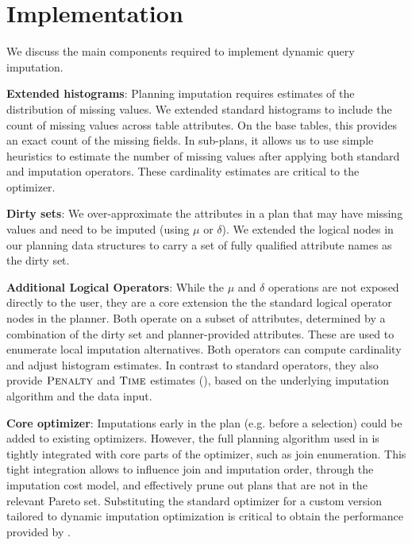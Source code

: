\section{Implementation}
We discuss the main components required to implement dynamic query imputation.

\textbf{Extended histograms}: Planning imputation requires estimates of the distribution of missing values. 
We extended standard histograms to include the count of missing values across table attributes.
On the base tables, this provides an exact count of the missing fields. 
In sub-plans, it allows us to use simple heuristics to estimate the number of missing values after applying
both standard and imputation operators. These cardinality estimates are critical to the optimizer.

\textbf{Dirty sets}: We over-approximate the attributes in a plan that may have missing values and need to be
imputed (using $\mu$ or $\delta$). We extended
the logical nodes in our planning data structures to carry a set of fully qualified attribute names as the dirty set. 

\textbf{Additional Logical Operators}: While the $\mu$ and $\delta$ operations are not exposed directly to the user, they are a core extension
the the standard logical operator nodes in the planner.
Both operate on a subset of attributes, determined by
a combination of the dirty set and planner-provided attributes. These are used to enumerate local imputation alternatives. Both operators
can compute cardinality and adjust histogram estimates. In contrast to standard operators, they also provide $\textsc{Penalty}$ and $\textsc{Time}$ estimates (),
based on the underlying imputation algorithm and the data input.

\textbf{Core optimizer}: Imputations early in the plan (e.g. before a selection) could be added to existing optimizers. However, the full
planning algorithm used in \ProjectName{} is tightly integrated with core parts of the optimizer, such as join enumeration. This tight integration allows \ProjectName{}
to influence join and imputation order, through the imputation cost model, and effectively prune out plans that are not in the relevant Pareto set.
Substituting the standard optimizer for a custom version tailored to dynamic imputation optimization is critical to obtain the
performance provided by \ProjectName{}.


